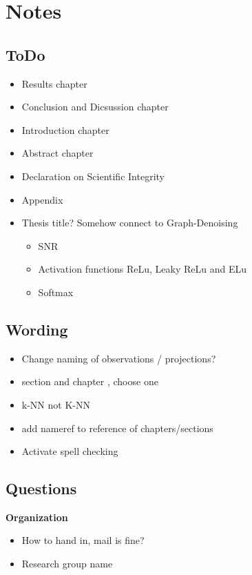 \chapter{Notes}

\section{ToDo}
\begin{itemize}
    \item Results chapter
    \item Conclusion and Dicsussion chapter
    \item Introduction chapter
    \item Abstract chapter
    \item Declaration on Scientific Integrity
    \item Appendix
    \item Thesis title? Somehow connect to Graph-Denoising
    \begin{itemize}
        \item SNR
        \item Activation functions ReLu,  Leaky ReLu and ELu
        \item Softmax
    \end{itemize}
\end{itemize}

\section{Wording}
\begin{itemize}
    \item Change naming of observations / projections?
    \item section and chapter , choose one
    \item k-NN not K-NN
    \item add nameref to reference of chapters/sections
    \item Activate spell checking
\end{itemize}

\section{Questions}
\textbf{Organization}
\begin{itemize}
    \item How to hand in, mail is fine?
    \item Research group name
\end{itemize}

